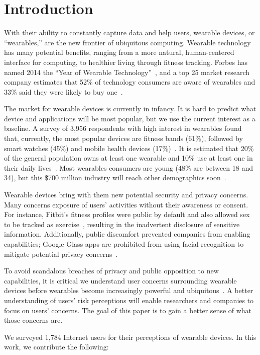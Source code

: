\section{Introduction}
With their ability to constantly capture data and help users, wearable devices, or ``wearables,'' are the new frontier of ubiquitous computing. Wearable technology has many potential benefits, ranging from a more natural, human-centered interface for computing, to healthier living through fitness tracking. Forbes has named 2014 the ``Year of Wearable Technology''~\cite{Forbes}, and a top 25 market research company estimates that 52\% of technology consumers are aware of wearables and 33\% said they were likely to buy one~\cite{NPD}. 

The market for wearable devices is currently in infancy. It is hard to predict what device and applications will be most popular, but we use the current interest as a baseline. A survey of 3,956 respondents with high interest in wearables found that, currently, the most popular devices are fitness bands (61\%), followed by smart watches (45\%) and mobile health devices (17\%)~\cite{Nilsen}. It is estimated that 20\% of the general population owns at least one wearable and 10\% use at least one in their daily lives~\cite{WearableStatNews}. Most wearables consumers are young (48\% are between 18 and 34), but this \$700 million industry will reach other demographics soon~\cite{cmo}. 

Wearable devices bring with them new potential security and privacy concerns. Many concerns exposure of users' activities without their awareness or consent. For instance, Fitbit's fitness profiles were public by default and also allowed sex to be tracked as exercise~\cite{Fitbit}, resulting in the inadvertent disclosure of sensitive information. Additionally, public discomfort prevented companies from enabling capabilities; Google Glass apps are prohibited from using facial recognition to mitigate potential privacy concerns~\cite{GlassDetection}.

To avoid scandalous breaches of privacy and public opposition to new capabilities, it is critical we understand user concerns surrounding wearable devices before wearables become increasingly powerful and ubiquitous~\cite{Implants}. A better understanding of users' risk perceptions will enable researchers and companies to focus on users' concerns. The goal of this paper is to gain a better sense of what those concerns are. 

We surveyed 1,784 Internet users for their perceptions of wearable devices. In this work, we contribute the following: \\[-0.8cm]

